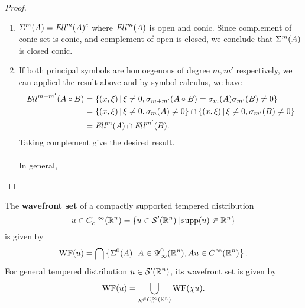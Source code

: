 \documentclass[12pt]{article}
\begin{document}
\begin{proof}
\begin{enumerate}
        \item $\Sigma^m(A) = \mathit{Ell}^m(A)^c$ where $\mathit{Ell}^m(A)$ is open and conic. Since complement of conic set is conic, and complement of open is closed, we conclude that $\Sigma^m(A)$ is closed conic. 
        
        
        \item If both principal symbols are homoegenous of degree $m, m'$ respectively, we can applied the result above and by symbol calculus, we have
        \begin{align*}
            \mathit{Ell}^{m + m'}(A \circ B) 
            & = \left\{(x, \xi) \, | \, \xi \neq 0, \sigma_{m + m'}(A \circ B) = \sigma_m(A) \sigma_{m'}(B) \neq 0\right\}\\
            & = \left\{(x, \xi) \, | \, \xi \neq 0, \sigma_m(A)  \neq 0\right\} \cap  \left\{(x, \xi) \, | \, \xi \neq 0, \sigma_{m'}(B)  \neq 0\right\} \\
            & = \mathit{Ell}^m(A) \cap \mathit{Ell}^{m'}(B). 
        \end{align*}
        Taking complement give the desired result. \\
        \\
        In general, 
    \end{enumerate}
    
\end{proof}



\begin{fdefinition}
    The \textbf{wavefront set} of a compactly supported tempered distribution 
    \[
    u \in C^{-\infty}_c({\mathbb R}^n) = \left\{u \in \mathcal{S}'({\mathbb R}^n) \, | \, \mathrm{supp}(u) \Subset {\ensuremath {\mathbb R}}^n\right\} 
    \]
    is given by 
    \begin{align*}
        \mathrm{WF}(u) = \bigcap \left\{\Sigma^0(A) \, | \, A \in \Psi^0_\infty({\mathbb R}^n), Au \in C^\infty({\mathbb R}^n)\right\}. 
    \end{align*}
    For general tempered distribution $u \in \mathcal{S}'({\mathbb R}^n)$, its wavefront set is given by 
    \begin{align*}
        \mathrm{WF}(u) = \bigcup_{\chi \in C^\infty_c({\mathbb R}^n)} \mathrm{WF}(\chi u). 
    \end{align*}
\end{fdefinition} 
\end{document}
